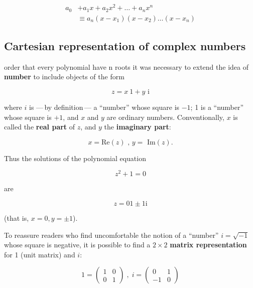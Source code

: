 \begin{equation}
  \begin{aligned}
    a_0 & + a_1x + a_2x^2 + \ldots + a_nx^n \\
    & \equiv a_n(x-x_1)(x-x_2) \ldots (x-x_n)
  \end{aligned}
\end{equation}

\subsection{Cartesian representation of complex numbers}
 order that every polynomial have n roots it was necessary to extend the idea of \textbf{number} to include objects of the form

\begin{equation}
  z = x\ 1 + y\text{ i}
\end{equation}

where $i$ is ---\,by definition\,--- a ``number'' whose square is $-1$; 1 is a ``number'' whose square is $+1$, and $x$ and $y$ are ordinary numbers. Conventionally, $x$ is called the \textbf{real part} of $z$, and $y$ the \textbf{imaginary part}:

\begin{equation}
  x = \text{Re$(z)$ , $y =$ Im$(z)$.}
\end{equation}

Thus the solutions of the polynomial equation

\begin{equation}
  z^2 + 1 = 0
\end{equation}

are

\begin{equation}
  z = 01 \pm 1\text{i}
\end{equation}

(that is, $x = 0, y = \pm1$).

To reassure readers who find uncomfortable the notion of a ``number'' $i = \sqrt{-1}$ whose square is negative, it is possible to find a $2\times2$ \textbf{matrix representation} for 1 (unit matrix) and $i$:

\begin{equation}
  1 =
  \begin{pmatrix}
    1 & 0 \\ 0 & 1
  \end{pmatrix}
  \; , \; i =
  \begin{pmatrix}
    0 & 1 \\ -1 & 0
  \end{pmatrix}
\end{equation}

